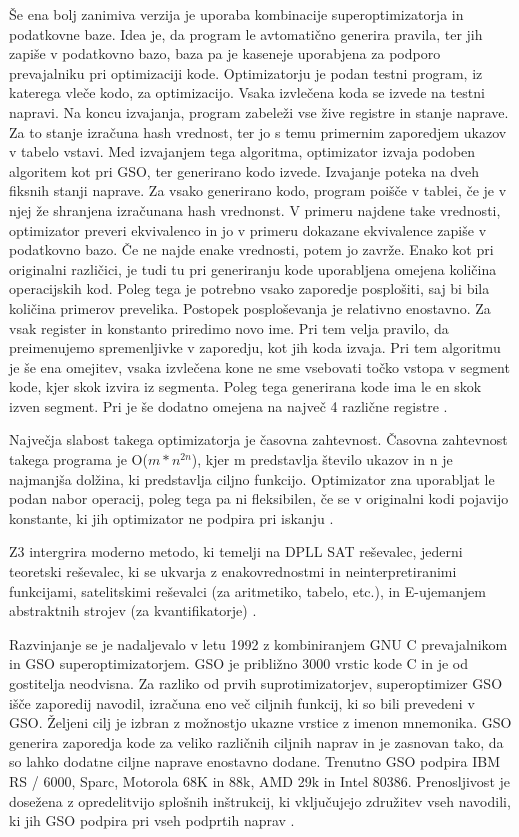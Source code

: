 \documentclass[a4paper, 12pt]{book}
\begin{document}
Še ena bolj zanimiva verzija je uporaba kombinacije superoptimizatorja in podatkovne baze. Idea je, da program le avtomatično generira pravila, ter jih zapiše v podatkovno bazo, baza pa je kaseneje uporabjena za podporo prevajalniku pri optimizaciji kode. Optimizatorju je podan testni program, iz katerega vleče kodo, za optimizacijo. Vsaka izvlečena koda se izvede na testni napravi. Na koncu izvajanja, program zabeleži vse žive registre in stanje naprave. Za to stanje izračuna hash vrednost, ter jo s temu primernim zaporedjem ukazov v tabelo vstavi. Med izvajanjem tega algoritma, optimizator izvaja podoben algoritem kot pri GSO, ter generirano kodo izvede. Izvajanje poteka na dveh fiksnih stanji naprave. Za vsako generirano kodo, program poišče v tablei, če je v njej že shranjena izračunana hash vrednonst. V primeru najdene take vrednosti, optimizator preveri ekvivalenco in jo v primeru dokazane ekvivalence zapiše v podatkovno bazo. Če ne najde enake vrednosti, potem jo zavrže. Enako kot pri originalni različici, je tudi tu pri generiranju kode uporabljena omejena količina operacijskih kod. Poleg tega je potrebno vsako zaporedje posplošiti, saj bi bila količina primerov prevelika. Postopek posploševanja je relativno enostavno. Za vsak register in konstanto priredimo novo ime. Pri tem velja pravilo, da preimenujemo spremenljivke v zaporedju, kot jih koda izvaja. Pri tem algoritmu je še ena omejitev, vsaka izvlečena kone ne sme vsebovati točko vstopa v segment kode, kjer skok izvira iz segmenta. Poleg tega generirana kode ima le en skok izven segment. Pri je še dodatno omejena na največ 4 različne registre \cite{super}.

Največja slabost takega optimizatorja je časovna zahtevnost. Časovna zahtevnost takega programa je O(\(m*n^{2n}\)), kjer m predstavlja število ukazov in n je najmanjša dolžina, ki predstavlja ciljno funkcijo. Optimizator zna uporabljat le podan nabor operacij, poleg tega pa ni fleksibilen, če se v originalni kodi pojavijo konstante, ki jih optimizator ne podpira pri iskanju  \cite{pdf5}.

Z3 intergrira moderno metodo, ki temelji na DPLL SAT reševalec, jederni teoretski reševalec, ki se ukvarja z enakovrednostmi in neinterpretiranimi funkcijami, satelitskimi reševalci (za aritmetiko, tabelo, etc.), in E-ujemanjem abstraktnih strojev (za kvantifikatorje) \cite{article3}.

Razvinjanje se je nadaljevalo v letu 1992 z kombiniranjem GNU C prevajalnikom in GSO superoptimizatorjem. GSO je približno 3000 vrstic kode C in je od gostitelja neodvisna. Za razliko od prvih suprotimizatorjev, superoptimizer GSO išče zaporedij navodil, izračuna eno več ciljnih funkcij, ki so bili prevedeni v GSO. Željeni cilj je izbran z možnostjo ukazne vrstice z imenon mnemonika. GSO generira zaporedja kode za veliko različnih ciljnih naprav in je zasnovan tako, da so lahko dodatne ciljne naprave enostavno dodane. Trenutno GSO podpira IBM RS / 6000, Sparc, Motorola 68K in 88k, AMD 29k in Intel 80386. Prenosljivost je dosežena z opredelitvijo splošnih inštrukcij, ki vključujejo združitev vseh navodili, ki jih GSO podpira pri vseh podprtih naprav \cite{url1}.
\end{document}
